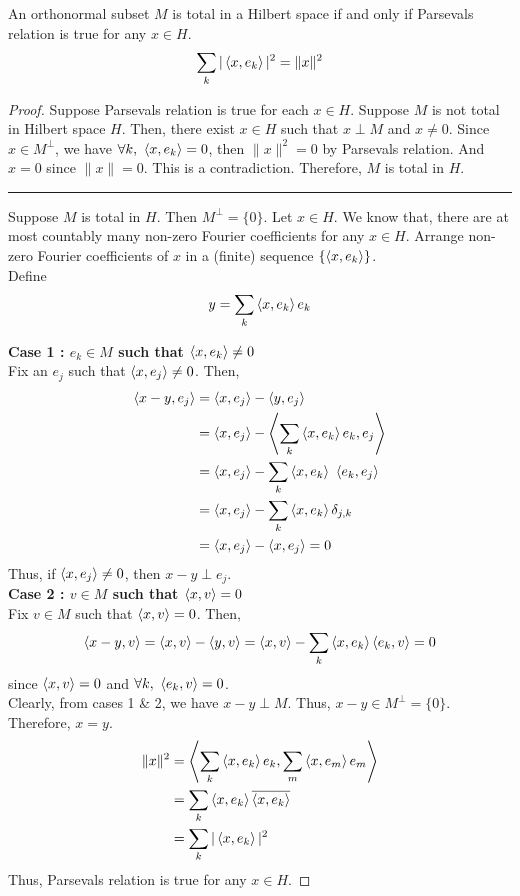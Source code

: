 \begin{theorem}
	An orthonormal subset $M$ is total in a Hilbert space if and only if Parsevals relation is true for any $x \in H$.
	\[ \sum_k |\left\langle x,e_k \right\rangle|^2 = \|x\|^2 \]
\end{theorem}
\begin{proof}
	Suppose Parsevals relation is true for each $x \in H$.
	Suppose $M$ is not total in Hilbert space $H$.
	Then, there exist $x \in H$ such that $x \perp M$ and $x \ne 0$.
	Since $x \in M^\perp$, we have $\forall k,\ \left\langle x,e_k \right\rangle = 0$, then $\|x\|^2 = 0$ by Parsevals relation.
	And $x = 0$ since $\|x\| = 0$.
	This is a contradiction.
	Therefore, $M$ is total in $H$.\\

	\hrule \vspace{1em}
	
	Suppose $M$ is total in $H$.
	Then $M^\perp = \{ 0 \}$.
	Let $x \in H$.
	We know that, there are at most countably many non-zero Fourier coefficients for any $x \in H$.
	Arrange non-zero Fourier coefficients of $x$ in a (finite) sequence $\left\{\left\langle x,e_k \right\rangle\right\}$.\\

	Define
	\[ y = \sum_k \left\langle x,e_k \right\rangle e_k \]

	\textbf{Case 1 : $e_k \in M$ such that $\left\langle x,e_k \right\rangle \ne 0$}\\
	Fix an $e_j$ such that $\left\langle x,e_j \right\rangle \ne 0$.
	Then,
	\begin{align*}
		\inner{x-y}{e_j} 
		& = \inner{x}{e_j} - \inner{y}{e_j} \\
		& = \inner{x}{e_j} - \inner{\sum_k \inner{x}{e_k}e_k}{e_j} \\
		& = \inner{x}{e_j} - \sum_k \inner{x}{e_k} \ \inner{e_k}{e_j} \\
		& = \inner{x}{e_j} - \sum_k \inner{x}{e_k} \delta_{j,k} \\
		& = \inner{x}{e_j} - \inner{x}{e_j} = 0
	\end{align*}
	Thus, if $\left\langle x,e_j \right\rangle \ne 0$, then $x-y \perp e_j$.\\

	\textbf{Case 2 : $v \in M$ such that $\left\langle x,v \right\rangle = 0$}\\
	Fix $v \in M$ such that $\left\langle x,v \right\rangle = 0$.
	Then, 
	\[ \left\langle x-y,v \right\rangle = \left\langle x,v \right\rangle - \left\langle y,v \right\rangle = \left\langle x,v \right\rangle - \sum_k \left\langle x,e_k \right\rangle \left\langle e_k,v \right\rangle = 0 \]
	since $\left\langle x,v \right\rangle = 0$ and $\forall k,\ \left\langle e_k,v \right\rangle = 0$.\\

	Clearly, from cases 1 \& 2, we have $x-y \perp M$.
	Thus, $x - y \in M^\perp = \{ 0 \}$.
	Therefore, $x = y$.
	\begin{align*}
		\|x\|^2
		& = \left\langle \sum_k \left\langle x,e_k \right\rangle e_k,\sum_m \left\langle x,e_m \right\rangle e_m \right\rangle  \\
		& = \sum_k \left\langle x,e_k \right\rangle \overline{\left\langle x,e_k \right\rangle} \\
		& = \sum_k |\left\langle x,e_k \right\rangle|^2
	\end{align*}
	Thus, Parsevals relation is true for any $x \in H$.
\end{proof}

